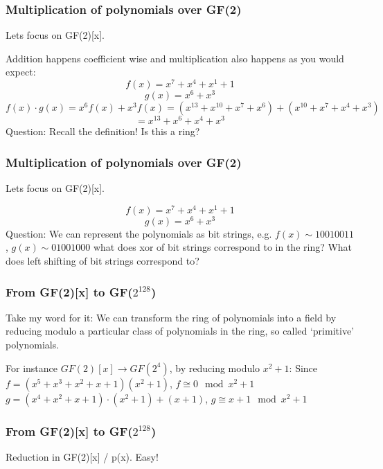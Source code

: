\documentclass{beamer}
\begin{document}
\begin{frame}
\frametitle{Multiplication of polynomials over GF(2)}
Lets focus on GF(2)[x].

\vspace{3mm}

Addition happens coefficient wise
and multiplication also happens as you would expect:
\[
    f(x) = x^{7} + x^{4} + x^{1} + 1
\]
\[
    g(x) = x^{6} + x^{3}
\]
\[
    f(x) \cdot g(x)
    =
    x^{6} f(x) +
    x^{3} f(x)
    = (x^{13} + x^{10} + x^{7} + x^{6})
    + (x^{10} + x^{7} + x^{4} + x^{3})
\]
\[
    = x^{13} + x^{6} + x^{4} + x^{3}
\]
Question: Recall the definition! Is this a ring?
\end{frame}

\begin{frame}
\frametitle{Multiplication of polynomials over GF(2)}
Lets focus on GF(2)[x].

\vspace{3mm}

\[
    f(x) = x^{7} + x^{4} + x^{1} + 1
\]
\[
    g(x) = x^{6} + x^{3}
\]
Question: We can represent the polynomials as bit strings,
e.g.
$f(x) \sim 10010011$,
$g(x) \sim 01001000$ what does xor of bit strings correspond to in the ring?
What does left shifting of bit strings correspond to?
\end{frame}

\begin{frame}
\frametitle{From GF(2)[x] to GF($2^{128}$)}

Take my word for it:
We can transform the ring of polynomials into a field by reducing
modulo a particular class of polynomials in the ring, so called `primitive' polynomials.

\vspace{3mm}

For instance $GF(2)[x] \to GF(2^{4})$, by reducing modulo $x^{2} + 1$:
Since $ f = (x^{5} + x^{3} + x^{2} + x + 1) (x^{2} + 1)$, $f \cong 0 \mod x^{2} + 1$
$ g = (x^{4} + x^{2} + x + 1) \cdot (x^{2} + 1) + (x + 1)$, $g \cong x + 1 \mod x^{2} + 1$

\end{frame}

\begin{frame}
\frametitle{From GF(2)[x] to GF($2^{128}$)}
Reduction in GF(2)[x] / p(x). Easy!
\end{frame}
\end{document}
